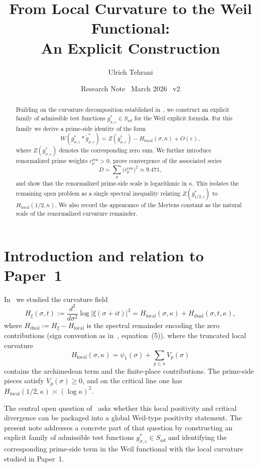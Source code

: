 \documentclass[11pt]{article}
\title{\vspace{-1.5em}\bfseries
From Local Curvature to the Weil Functional:\\[0.4em]
\large An Explicit Construction}
\author{Ulrich Tehrani}
\date{Research Note \textperiodcentered\ March 2026 \textperiodcentered\ v2}
\begin{document}
\maketitle

\begin{abstract}
Building on the curvature decomposition established in~\cite{paper1},
we construct an explicit family of admissible test functions
$g^*_{\sigma,\varepsilon} \in S_{ad}$ for the Weil explicit formula.
For this family we derive a prime-side identity of the form
\[
W(g^*_{\sigma,\varepsilon} * \check g^*_{\sigma,\varepsilon})
=
Z(g^*_{\sigma,\varepsilon}) - H_{\mathrm{local}}(\sigma,\kappa) + O(\varepsilon),
\]
where $Z(g^*_{\sigma,\varepsilon})$ denotes the corresponding zero sum.
We further introduce renormalized prime weights
$c_p^{\mathrm{ren}} > 0$, prove convergence of the associated series
\[
D = \sum_p \bigl(c_p^{\mathrm{ren}}\bigr)^2 \approx 9.471,
\]
and show that the renormalized prime-side scale is logarithmic in $\kappa$.
This isolates the remaining open problem as a single spectral inequality
relating $Z(g^*_{1/2,\varepsilon})$ to $H_{\mathrm{local}}(1/2,\kappa)$.
We also record the appearance of the Mertens constant as the natural scale
of the renormalized curvature remainder.
\end{abstract}

\section{Introduction and relation to Paper~1}

In~\cite{paper1} we studied the curvature field
\[
H_{\xi}(\sigma,t)
:= \frac{d^2}{d\sigma^2}\log|\xi(\sigma+it)|^2
= H_{\mathrm{local}}(\sigma,\kappa) + H_{\mathrm{dual}}(\sigma,t,\kappa),
\]
where $H_{\mathrm{dual}} := H_{\xi} - H_{\mathrm{local}}$ is the spectral
remainder encoding the zero contributions (sign convention as in~\cite{paper1},
equation~(5)).
where the truncated local curvature
\[
H_{\mathrm{local}}(\sigma,\kappa) = \psi_1(\sigma)
+ \sum_{p\le\kappa} V_p(\sigma)
\]
contains the archimedean term and the finite-place contributions. The prime-side pieces satisfy
$V_p(\sigma) \ge 0$, and on the critical line one has
$H_{\mathrm{local}}(1/2,\kappa) \asymp (\log\kappa)^2$.

The central open question of~\cite[\S7]{paper1} asks whether this local
positivity and critical divergence can be packaged into a global
Weil-type positivity statement. The present note addresses a concrete part of
that question by constructing an explicit family of admissible test functions
$g^*_{\sigma,\varepsilon} \in S_{ad}$ and identifying the corresponding
prime-side term in the Weil functional with the local curvature studied in
Paper~1.
\end{document}
